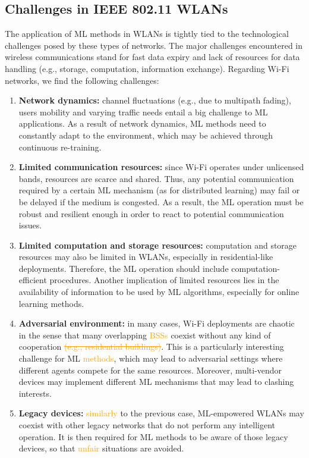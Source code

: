 \documentclass[journal]{IEEEtran}
\begin{document}
\subsection{Challenges in IEEE 802.11 WLANs}
\label{section:ieee_80211_wlans}
The application of ML methods in WLANs is tightly tied to the technological challenges posed by these types of networks. The major challenges encountered in wireless communications stand for fast data expiry and lack of resources for data handling (e.g., storage, computation, information exchange). Regarding Wi-Fi networks, we find the following challenges:
\begin{enumerate}
	\item \textbf{Network dynamics:} channel fluctuations (e.g., due to multipath fading), users mobility and varying traffic needs entail a big challenge to ML applications. As a result of network dynamics, ML methods need to constantly adapt to the environment, which may be achieved through continuous re-training.
	\item \textbf{Limited communication resources:} since Wi-Fi operates under unlicensed bands, resources are scarce and shared. Thus, any potential communication required by a certain ML mechanism (as for distributed learning) may fail or be delayed if the medium is congested. As a result, the ML operation must be robust and resilient enough in order to react to potential communication issues.
	\item \textbf{Limited computation and storage resources:} computation and storage resources may also be limited in WLANs, especially in residential-like deployments. Therefore, the ML operation should include computation-efficient procedures. Another implication of limited resources lies in the availability of information to be used by ML algorithms, especially for online learning methods.
	\item \textbf{Adversarial environment:} in many cases, Wi-Fi deployments are chaotic in the sense that many overlapping \textcolor{orange}{BSSs} coexist without any kind of cooperation \textcolor{orange}{\st{(e.g., residential buildings)}}. This is a particularly interesting challenge for ML \textcolor{orange}{methods}, which may lead to adversarial settings where different agents compete for the same resources. Moreover, multi-vendor devices may implement different ML mechanisms that may lead to clashing interests.
	\item \textbf{Legacy devices:} \textcolor{orange}{similarly} to the previous case, ML-empowered WLANs may coexist with other legacy networks that do not perform any intelligent operation. It is then required for ML methods to be aware of those legacy devices, so that \textcolor{orange}{unfair} situations are avoided.
\end{enumerate}
\end{document}
